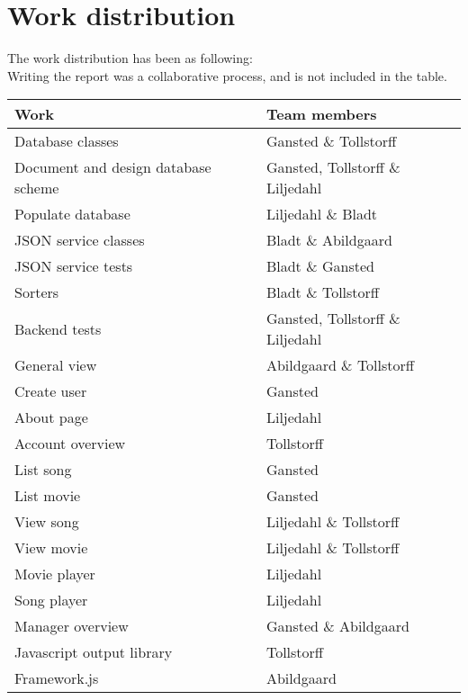 \section{Work distribution}
The work distribution has been as following:\\
Writing the report was a collaborative process, and is not included in the
table.

\begin{tabular} { | p{6cm} | p{6cm} | }
\hline
\textbf{Work} & \textbf{Team members} \\
\hline
Database classes & Gansted \& Tollstorff \\
\hline
Document and design database scheme & Gansted, Tollstorff \& Liljedahl \\
\hline
Populate database & Liljedahl \& Bladt \\
\hline
JSON service classes & Bladt \& Abildgaard \\
\hline
JSON service tests & Bladt \& Gansted \\
\hline
Sorters & Bladt \& Tollstorff \\
\hline
Backend tests & Gansted, Tollstorff \& Liljedahl \\
\hline
General view & Abildgaard \& Tollstorff \\
\hline
Create user & Gansted \\
\hline
About page & Liljedahl \\
\hline
Account overview & Tollstorff \\
\hline
List song & Gansted \\
\hline
List movie & Gansted \\
\hline
View song & Liljedahl \& Tollstorff \\
\hline
View movie & Liljedahl \& Tollstorff \\
\hline
Movie player & Liljedahl \\
\hline
Song player & Liljedahl \\
\hline
Manager overview & Gansted \& Abildgaard \\
\hline
Javascript output library & Tollstorff \\
\hline
Framework.js & Abildgaard \\
\hline
\end{tabular}
